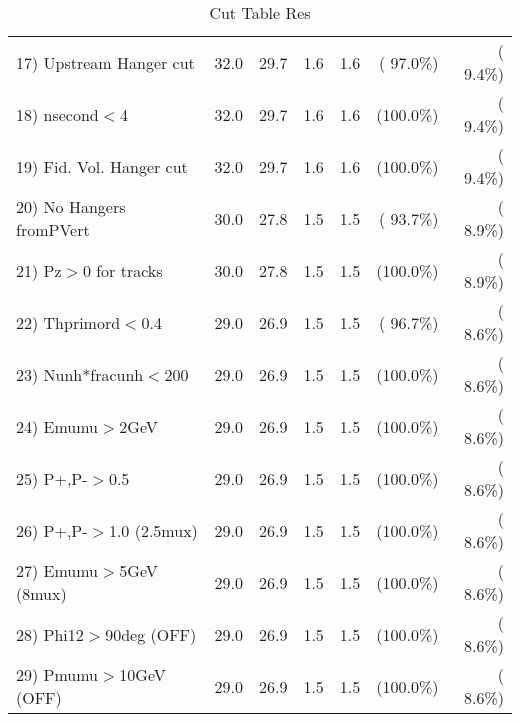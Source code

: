 \begin{table}[h!]
\begin{tabular}{||l||r|r|r|r|r|r||}
 17) Upstream Hanger cut  &         32.0 &         29.7 &          1.6 &          1.6 & ( 97.0\%) & (  9.4\%) \\
 18) nsecond$<$4          &         32.0 &         29.7 &          1.6 &          1.6 & (100.0\%) & (  9.4\%) \\
 19) Fid. Vol. Hanger cut &         32.0 &         29.7 &          1.6 &          1.6 & (100.0\%) & (  9.4\%) \\
 20) No Hangers fromPVert &         30.0 &         27.8 &          1.5 &          1.5 & ( 93.7\%) & (  8.9\%) \\
 21) Pz$>$0 for tracks    &         30.0 &         27.8 &          1.5 &          1.5 & (100.0\%) & (  8.9\%) \\
 22) Thprimord$<$0.4      &         29.0 &         26.9 &          1.5 &          1.5 & ( 96.7\%) & (  8.6\%) \\
 23) Nunh*fracunh$<$200   &         29.0 &         26.9 &          1.5 &          1.5 & (100.0\%) & (  8.6\%) \\
 24) Emumu$>$2GeV         &         29.0 &         26.9 &          1.5 &          1.5 & (100.0\%) & (  8.6\%) \\
 25) P+,P-$>$0.5          &         29.0 &         26.9 &          1.5 &          1.5 & (100.0\%) & (  8.6\%) \\
 26) P+,P-$>$1.0 (2.5mux) &         29.0 &         26.9 &          1.5 &          1.5 & (100.0\%) & (  8.6\%) \\
 27) Emumu$>$5GeV  (8mux) &         29.0 &         26.9 &          1.5 &          1.5 & (100.0\%) & (  8.6\%) \\
 28) Phi12$>$90deg  (OFF) &         29.0 &         26.9 &          1.5 &          1.5 & (100.0\%) & (  8.6\%) \\
 29) Pmumu$>$10GeV  (OFF) &         29.0 &         26.9 &          1.5 &          1.5 & (100.0\%) & (  8.6\%) \\
 \hline
 \hline
 \end{tabular}
 \caption{Cut Table  Res      }
 \label{tab-cutcohjpsi-mumu_res}
 \end{table}
